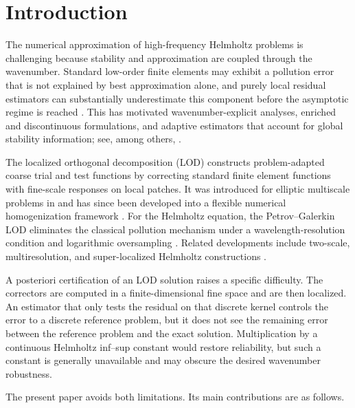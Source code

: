 \section{Introduction}\label{sec:introduction}

The numerical approximation of high-frequency Helmholtz problems is
challenging because stability and approximation are coupled through the
wavenumber.  Standard low-order finite elements may exhibit a pollution
error that is not explained by best approximation alone, and purely local
residual estimators can substantially underestimate this component before
the asymptotic regime is reached
\cite{BabuskaIhlenburgStrouboulisGangaraj1997a,
BabuskaIhlenburgStrouboulisGangaraj1997b,MelenkSauter2011}.  This has
motivated wavenumber-explicit analyses, enriched and discontinuous
formulations, and adaptive estimators that account for global stability
information; see, among others,
\cite{SauterZech2015,CongreveGedickePerugia2019,
ChaumontFreletErnVohralik2021}.

The localized orthogonal decomposition (LOD) constructs problem-adapted
coarse trial and test functions by correcting standard finite element
functions with fine-scale responses on local patches.  It was introduced
for elliptic multiscale problems in \cite{MalqvistPeterseim2014} and has
since been developed into a flexible numerical homogenization framework
\cite{MalqvistPeterseim2020,EngwerHenningMalqvistPeterseim2019}.  For the
Helmholtz equation, the Petrov--Galerkin LOD eliminates the classical
pollution mechanism under a wavelength-resolution condition and logarithmic
oversampling \cite{Peterseim2017}.  Related developments include two-scale,
multiresolution, and super-localized Helmholtz constructions
\cite{OhlbergerVerfurth2017,HauckPeterseim2022,
FreeseHauckPeterseim2024}.

A posteriori certification of an LOD solution raises a specific difficulty.
The correctors are computed in a finite-dimensional fine space and are then
localized.  An estimator that only tests the residual on that discrete
kernel controls the error to a discrete reference problem, but it does not
see the remaining error between the reference problem and the exact
solution.  Multiplication by a continuous Helmholtz inf--sup constant would
restore reliability, but such a constant is generally unavailable and may
obscure the desired wavenumber robustness.

The present paper avoids both limitations.  Its main contributions are as
follows.

